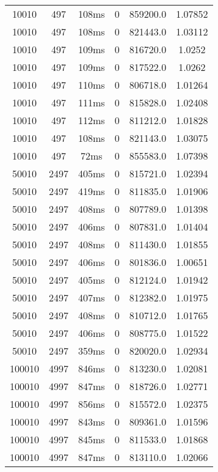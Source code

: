 \documentclass[./main.tex]{subfiles}
\begin{document}
\begin{table}
\begin{tabular}{ c | c | c | c | c | c }
        10010 & 497 & 108ms & 0 & 859200.0 & 1.07852 \\
        10010 & 497 & 108ms & 0 & 821443.0 & 1.03112 \\
        \rowcolor{lightgray} 10010 & 497 & 109ms & 0 & 816720.0 & 1.0252 \\
        10010 & 497 & 109ms & 0 & 817522.0 & 1.0262 \\
        10010 & 497 & 110ms & 0 & 806718.0 & 1.01264 \\
        10010 & 497 & 111ms & 0 & 815828.0 & 1.02408 \\
        10010 & 497 & 112ms & 0 & 811212.0 & 1.01828 \\
        10010 & 497 & 108ms & 0 & 821143.0 & 1.03075 \\
        10010 & 497 & 72ms & 0 & 855583.0 & 1.07398 \\
        \hline
        50010 & 2497 & 405ms & 0 & 815721.0 & 1.02394 \\
        50010 & 2497 & 419ms & 0 & 811835.0 & 1.01906 \\
        50010 & 2497 & 408ms & 0 & 807789.0 & 1.01398 \\
        50010 & 2497 & 406ms & 0 & 807831.0 & 1.01404 \\
        \rowcolor{lightgray} 50010 & 2497 & 408ms & 0 & 811430.0 & 1.01855 \\
        50010 & 2497 & 406ms & 0 & 801836.0 & 1.00651 \\
        50010 & 2497 & 405ms & 0 & 812124.0 & 1.01942 \\
        50010 & 2497 & 407ms & 0 & 812382.0 & 1.01975 \\
        50010 & 2497 & 408ms & 0 & 810712.0 & 1.01765 \\
        50010 & 2497 & 406ms & 0 & 808775.0 & 1.01522 \\
        50010 & 2497 & 359ms & 0 & 820020.0 & 1.02934 \\
        \hline
        \rowcolor{lightgray} 100010 & 4997 & 846ms & 0 & 813230.0 & 1.02081 \\
        100010 & 4997 & 847ms & 0 & 818726.0 & 1.02771 \\
        100010 & 4997 & 856ms & 0 & 815572.0 & 1.02375 \\
        100010 & 4997 & 843ms & 0 & 809361.0 & 1.01596 \\
        100010 & 4997 & 845ms & 0 & 811533.0 & 1.01868 \\
        100010 & 4997 & 847ms & 0 & 813110.0 & 1.02066 \\

\end{tabular}
\end{table}
\end{document}
